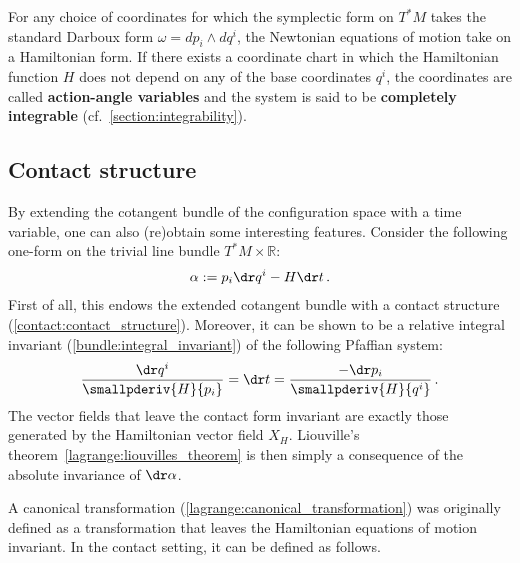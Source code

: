     For any choice of coordinates for which the symplectic form on $T^*M$ takes the standard Darboux form $\omega=dp_i\wedge dq^i$, the Newtonian equations of motion take on a Hamiltonian form. If there exists a coordinate chart in which the Hamiltonian function $H$ does not depend on any of the base coordinates $q^i$, the coordinates are called \textbf{action-angle variables} and the system is said to be \textbf{completely integrable} (cf.~\cref{section:integrability}).

\subsection{Contact structure}

    By extending the cotangent bundle of the configuration space with a time variable, one can also (re)obtain some interesting features. Consider the following one-form on the trivial line bundle $T^*M\times\mathbb{R}$:
    \begin{gather}
        \alpha := p_i\dr q^i - H\dr t\,.
    \end{gather}
    First of all, this endows the extended cotangent bundle with a contact structure (\cref{contact:contact_structure}). Moreover, it can be shown to be a relative integral invariant (\cref{bundle:integral_invariant}) of the following Pfaffian system:
    \begin{gather}
        \frac{\dr q^i}{\smallpderiv{H}{p_i}} = \dr t = \frac{-\dr p_i}{\smallpderiv{H}{q^i}}\,.
    \end{gather}
    The vector fields that leave the contact form invariant are exactly those generated by the Hamiltonian vector field $X_H$. Liouville's theorem~\ref{lagrange:liouvilles_theorem} is then simply a consequence of the absolute invariance of $\dr\alpha$.

    A canonical transformation (\cref{lagrange:canonical_transformation}) was originally defined as a transformation that leaves the Hamiltonian equations of motion invariant. In the contact setting, it can be defined as follows.


